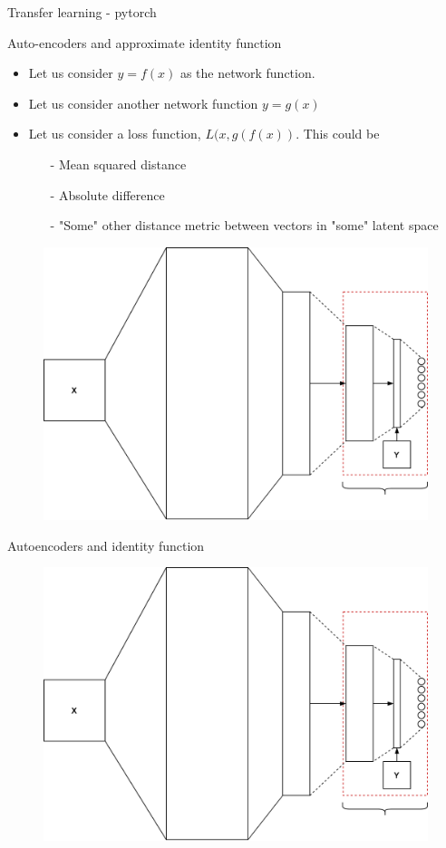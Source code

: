 \begin{frame}{Transfer learning - pytorch}

\end{frame}

\begin{frame}{Auto-encoders and approximate identity function}
\begin{itemize}
	\item Let us consider $y=f(x)$ as the network function.
	\item Let us consider another network function $y=g(x)$
	\item Let us consider a loss function, $L(x,g(f(x))$. This could be 
	\begin{itemize}
		\item[-] Mean squared distance 
		\item[-] Absolute difference 
		\item[-] "Some" other distance metric between vectors in "some" latent space 
	\end{itemize}  
\end{itemize}
	\begin{figure}
		\includegraphics[width=.45\textwidth]{figures/autoencoder_1}
	\end{figure}
\end{frame}
\begin{frame}{Autoencoders and identity function} 
	\begin{center}
		\begin{figure}
			\includegraphics[width=.8\textwidth]{figures/autoencoder_1}
		\end{figure}
	\end{center}
\end{frame}
